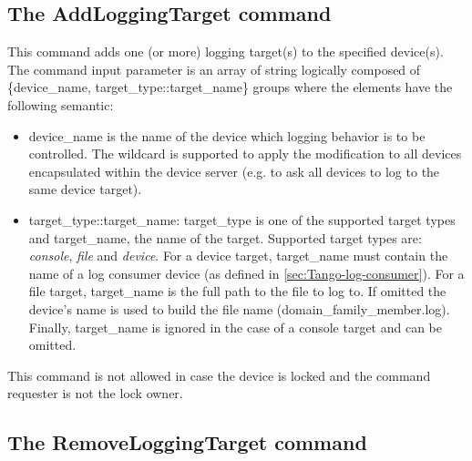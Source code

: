 \subsection{The AddLoggingTarget command}

This command adds one (or more) logging target(s) to the specified
device(s). The command input parameter is an array of string logically
composed of \{device\_name, target\_type::target\_name\} groups where
the elements have the following semantic: 
\begin{itemize}
\item device\_name is the name of the device which logging behavior is to
be controlled. The wildcard \textquotedbl{}{*}\textquotedbl{} is supported
to apply the modification to all devices encapsulated within the device
server (e.g. to ask all devices to log to the same device target).
\item target\_type::target\_name: target\_type is one of the supported target
types and target\_name, the name of the target. Supported target types
are: \emph{console}, \emph{file} and \emph{device}. For a device target,
target\_name must contain the name of a log consumer device (as defined
in \ref{sec:Tango-log-consumer}). For a file target, target\_name
is the full path to the file to log to. If omitted the device's name
is used to build the file name (domain\_family\_member.log). Finally,
target\_name is ignored in the case of a console target and can be
omitted.
\end{itemize}
This command is not allowed in case the device is locked and the command
requester is not the lock owner.

\subsection{The RemoveLoggingTarget command}

